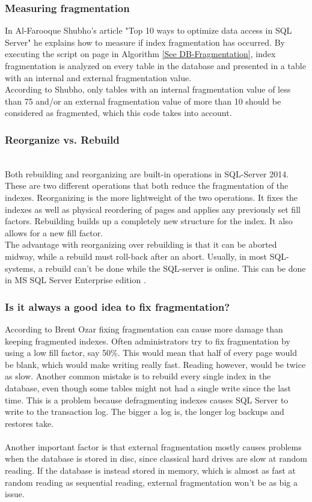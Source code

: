 \documentclass{cslthse-msc}
\begin{document}
\subsubsection{Measuring fragmentation}
In Al-Farooque Shubho's article "Top 10 ways to optimize data access in SQL Server"\cite{Shubho09} he explains how to measure if index fragmentation has occurred. By executing the script on page \pageref{lst:fragalg} in Algorithm \ref{See DB-Fragmentation}, index fragmentation is analyzed on every table in the database and presented in a table with an internal and external fragmentation value. \\

According to Shubho, only tables with an internal fragmentation value of less than 75 and/or an external fragmentation value of more than 10 should be considered as fragmented, which this code takes into account.

\subsubsection{Reorganize vs. Rebuild}\mbox{}\\
Both rebuilding and reorganizing are built-in operations in SQL-Server 2014. These are two different operations that both reduce the fragmentation of the indexes. Reorganizing is the more lightweight of the two operations. It fixes the indexes as well as physical reordering of pages and applies any previously set fill factors. Rebuilding builds up a completely new structure for the index. It also allows for a new fill factor.\\
The advantage with reorganizing over rebuilding is that it can be aborted midway, while a rebuild must roll-back after an abort. Usually, in most SQL-systems, a rebuild can't be done while the SQL-server is online. This can be done in MS SQL Server Enterprise edition \cite{Little13}.

\subsubsection{Is it always a good idea to fix fragmentation?}
According to Brent Ozar \cite{Ozar12} fixing fragmentation can cause more damage than keeping fragmented indexes. Often administrators try to fix fragmentation by using a low fill factor, say 50\%. This would mean that half of every page would be blank, which would make writing really fast. Reading however, would be twice as slow. Another common mistake is to rebuild every single index in the database, even though some tables might not had a single write since the last time. This is a problem because defragmenting indexes causes SQL Server to write to the transaction log. The bigger a log is, the longer log backups and restores take.\\\\
Another important factor is that external fragmentation mostly causes problems when the database is stored in disc, since classical hard drives are slow at random reading. If the database is instead stored in memory, which is almost as fast at random reading as sequential reading, external fragmentation won't be as big a issue.
\end{document}
